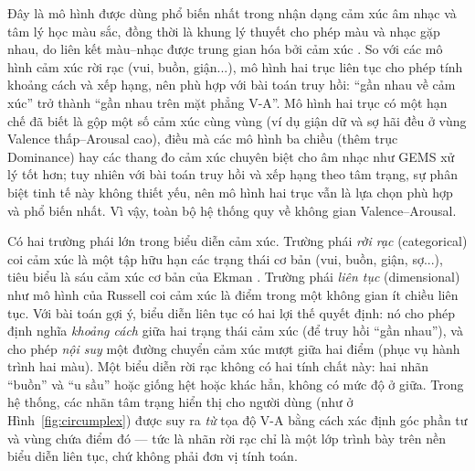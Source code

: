 \documentclass[../DoAn.tex]{subfiles}
\begin{document}
Đây là mô hình được dùng phổ biến nhất trong nhận dạng cảm xúc âm nhạc và tâm lý học màu sắc, đồng thời là khung lý thuyết cho phép màu và nhạc gặp nhau, do liên kết màu--nhạc được trung gian hóa bởi cảm xúc \cite{palmer2013music}. So với các mô hình cảm xúc rời rạc (vui, buồn, giận...), mô hình hai trục liên tục cho phép tính khoảng cách và xếp hạng, nên phù hợp với bài toán truy hồi: ``gần nhau về cảm xúc'' trở thành ``gần nhau trên mặt phẳng V-A''. Mô hình hai trục có một hạn chế đã biết là gộp một số cảm xúc cùng vùng (ví dụ giận dữ và sợ hãi đều ở vùng Valence thấp--Arousal cao), điều mà các mô hình ba chiều (thêm trục Dominance) \cite{russellmehrabian1977pad} hay các thang đo cảm xúc chuyên biệt cho âm nhạc như GEMS \cite{zentner2008gems} xử lý tốt hơn; tuy nhiên với bài toán truy hồi và xếp hạng theo tâm trạng, sự phân biệt tinh tế này không thiết yếu, nên mô hình hai trục vẫn là lựa chọn phù hợp và phổ biến nhất. Vì vậy, toàn bộ hệ thống quy về không gian Valence--Arousal.

Có hai trường phái lớn trong biểu diễn cảm xúc. Trường phái \textit{rời rạc} (categorical) coi cảm xúc là một tập hữu hạn các trạng thái cơ bản (vui, buồn, giận, sợ...), tiêu biểu là sáu cảm xúc cơ bản của Ekman \cite{ekman1992basic}. Trường phái \textit{liên tục} (dimensional) như mô hình của Russell coi cảm xúc là điểm trong một không gian ít chiều liên tục. Với bài toán gợi ý, biểu diễn liên tục có hai lợi thế quyết định: nó cho phép định nghĩa \textit{khoảng cách} giữa hai trạng thái cảm xúc (để truy hồi ``gần nhau''), và cho phép \textit{nội suy} một đường chuyển cảm xúc mượt giữa hai điểm (phục vụ hành trình hai màu). Một biểu diễn rời rạc không có hai tính chất này: hai nhãn ``buồn'' và ``u sầu'' hoặc giống hệt hoặc khác hẳn, không có mức độ ở giữa. Trong hệ thống, các nhãn tâm trạng hiển thị cho người dùng (như ở Hình~\ref{fig:circumplex}) được suy ra \textit{từ} tọa độ V-A bằng cách xác định góc phần tư và vùng chứa điểm đó --- tức là nhãn rời rạc chỉ là một lớp trình bày trên nền biểu diễn liên tục, chứ không phải đơn vị tính toán.
\end{document}
